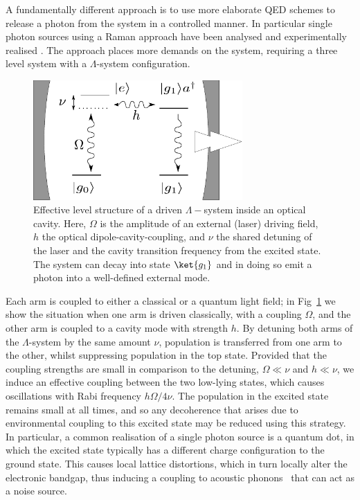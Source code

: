 A fundamentally different approach is to use more elaborate QED schemes to release a photon from the system in a controlled manner. In particular single photon sources using a Raman approach have been analysed \cite{kiraz:2004, santori:2009} and experimentally realised \cite{rempe:prl:02}. The approach places more demands on the system, requiring a  three level system with a $\Lambda$-system configuration.
\begin{figure}[htb]
  \begin{center}
  \includegraphics[width=8cm]{assets/lambda_system.pdf}
  \end{center}
  \caption{Effective level structure of a driven $\Lambda-$system inside an optical cavity. Here, $\Omega$ is the amplitude of an external (laser) driving field, $h$ the optical dipole-cavity-coupling, and $\nu$ the shared detuning of the laser and the cavity transition frequency  from the excited state. The system can decay into state $\ket{g_1}$ and in doing so emit a photon into a well-defined external mode.}
  \label{lambda_system}
\end{figure}
Each arm is coupled to either a classical or a quantum light field; in Fig~\ref{lambda_system} we show the situation when one arm is driven classically, with a coupling $\Omega$, and the other arm is coupled to a cavity mode with strength $h$. By detuning both arms of the $\Lambda$-system by the same amount $\nu$, population is transferred from one arm to the other, whilst suppressing population in the top state. Provided that the coupling strengths are small in comparison to the detuning, $\Omega \ll \nu$ and $h\ll\nu$, we induce an effective coupling between the two low-lying states, which causes oscillations with Rabi frequency ${h\Omega}/{4 \nu}$. The population in the excited state remains small at all times, and so any decoherence that arises due to environmental coupling to this excited state may be reduced using this strategy. In particular, a common realisation of a single photon source is a quantum dot, in which the excited state typically has a different charge configuration to the ground state. This causes local lattice distortions, which in turn locally alter the electronic bandgap, thus inducing a coupling to acoustic phonons~\cite{ramsay:2010, mahan00} that can act as a noise source. 

